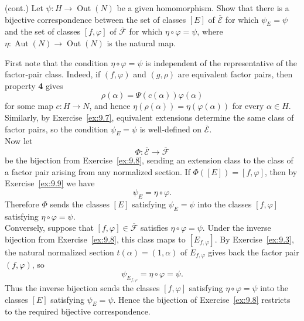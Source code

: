 \documentclass[../Odyssey_Project.tex]{subfiles}
\begin{document}
\begin{exercise}
\label{ex:9.10}
(cont.) Let $\psi: H \to \operatorname{Out}(N)$ be a given homomorphism. Show that there is a bijective correspondence between the set of classes $[E]$ of $\overline{\mathcal{E}}$ for which $\psi_E = \psi$ and the set of classes $[f, \varphi]$ of $\overline{\mathcal{F}}$ for which $\eta \circ \varphi = \psi$, where $\eta: \operatorname{Aut}(N) \to \operatorname{Out}(N)$ is the natural map.
\end{exercise}
\begin{solution}
First note that the condition $\eta\circ\varphi=\psi$ is independent of the representative of the factor-pair class. Indeed, if $(f,\varphi)$ and $(g,\rho)$ are equivalent factor pairs, then property \textbf{4} gives
\[
    \rho(\alpha)=\Psi(c(\alpha))\varphi(\alpha)
\]
for some map $c\colon H\to N$, and hence $\eta(\rho(\alpha))=\eta(\varphi(\alpha))$ for every $\alpha\in H$. Similarly, by Exercise~\ref{ex:9.7}, equivalent extensions determine the same class of factor pairs, so the condition $\psi_E=\psi$ is well-defined on $\overline{\mathcal{E}}$.\\
Now let
\[
    \Phi\colon \overline{\mathcal{E}}\to\overline{\mathcal{F}}
\]
be the bijection from Exercise~\ref{ex:9.8}, sending an extension class to the class of a factor pair arising from any normalized section. If $\Phi([E])=[f,\varphi]$, then by Exercise~\ref{ex:9.9} we have
\[
    \psi_E=\eta\circ\varphi.
\]
Therefore $\Phi$ sends the classes $[E]$ satisfying $\psi_E=\psi$ into the classes $[f,\varphi]$ satisfying $\eta\circ\varphi=\psi$.\\
Conversely, suppose that $[f,\varphi]\in\overline{\mathcal{F}}$ satisfies $\eta\circ\varphi=\psi$. Under the inverse bijection from Exercise~\ref{ex:9.8}, this class maps to $[E_{f,\varphi}]$. By Exercise~\ref{ex:9.3}, the natural normalized section $t(\alpha)=(1,\alpha)$ of $E_{f,\varphi}$ gives back the factor pair $(f,\varphi)$, so
\[
    \psi_{E_{f,\varphi}}=\eta\circ\varphi=\psi.
\]
Thus the inverse bijection sends the classes $[f,\varphi]$ satisfying $\eta\circ\varphi=\psi$ into the classes $[E]$ satisfying $\psi_E=\psi$. Hence the bijection of Exercise~\ref{ex:9.8} restricts to the required bijective correspondence.
\end{solution}
\end{document}
